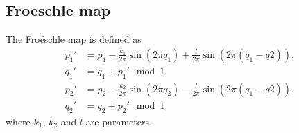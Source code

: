 \documentclass{article}
\begin{document}
\subsection*{Froeschle map}
The Fro\'eschle map is defined as
\begin{align*}
p_1'&=p_1-\frac{k_1}{2\pi}\sin(2\pi q_1)+\frac{l}{2\pi}\sin(2\pi (q_1-q2)),\\
q_1'&=q_1+p_1'\mod 1,\\
p_2'&=p_2-\frac{k_2}{2\pi}\sin(2\pi q_2)-\frac{l}{2\pi}\sin(2\pi (q_1-q2)),\\
q_2'&=q_2+p_2'\mod 1,
\end{align*}
where $k_1$, $k_2$ and $l$ are parameters.
\end{document}
